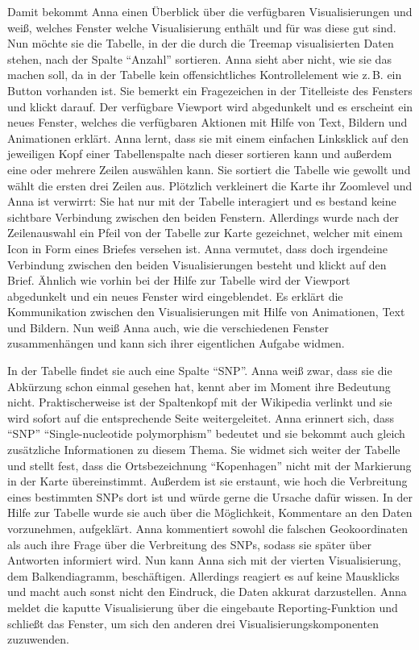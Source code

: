\documentclass[
	headsepline,
	footsepline,
	fontsize=12pt,
	bibliography=totoc
]{scrbook}
\begin{document}
Damit bekommt Anna einen Überblick über die verfügbaren Visualisierungen und weiß, welches Fenster welche Visualisierung enthält und für was diese gut sind. Nun möchte sie die Tabelle, in der die durch die Treemap visualisierten Daten stehen, nach der Spalte \enquote{Anzahl} sortieren. Anna sieht aber nicht, wie sie das machen soll, da in der Tabelle kein offensichtliches Kontrollelement wie z.\,B. ein Button vorhanden ist. Sie bemerkt ein Fragezeichen in der Titelleiste des Fensters und klickt darauf. Der verfügbare Viewport wird abgedunkelt und es erscheint ein neues Fenster, welches die verfügbaren Aktionen mit Hilfe von Text, Bildern und Animationen erklärt. Anna lernt, dass sie mit einem einfachen Linksklick auf den jeweiligen Kopf einer Tabellenspalte nach dieser sortieren kann und außerdem eine oder mehrere Zeilen auswählen kann. Sie sortiert die Tabelle wie gewollt und wählt die ersten drei Zeilen aus. Plötzlich verkleinert die Karte ihr Zoomlevel und Anna ist verwirrt: Sie hat nur mit der Tabelle interagiert und es bestand keine sichtbare Verbindung zwischen den beiden Fenstern. Allerdings wurde nach der Zeilenauswahl ein Pfeil von der Tabelle zur Karte gezeichnet, welcher mit einem Icon in Form eines Briefes versehen ist. Anna vermutet, dass doch irgendeine Verbindung zwischen den beiden Visualisierungen besteht und klickt auf den Brief. Ähnlich wie vorhin bei der Hilfe zur Tabelle wird der Viewport abgedunkelt und ein neues Fenster wird eingeblendet. Es erklärt die Kommunikation zwischen den Visualisierungen mit Hilfe von Animationen, Text und Bildern. Nun weiß Anna auch, wie die verschiedenen Fenster zusammenhängen und kann sich ihrer eigentlichen Aufgabe widmen.


In der Tabelle findet sie auch eine Spalte \enquote{SNP}. Anna weiß zwar, dass sie die Abkürzung schon einmal gesehen hat, kennt aber im Moment ihre Bedeutung nicht. Praktischerweise ist der Spaltenkopf mit der Wikipedia verlinkt und sie wird sofort auf die entsprechende Seite weitergeleitet. Anna erinnert sich, dass \enquote{SNP} \enquote{Single-nucleotide polymorphism} bedeutet und sie bekommt auch gleich zusätzliche Informationen zu diesem Thema. Sie widmet sich weiter der Tabelle und stellt fest, dass die Ortsbezeichnung \enquote{Kopenhagen} nicht mit der Markierung in der Karte übereinstimmt. Außerdem ist sie erstaunt, wie hoch die Verbreitung eines bestimmten SNPs dort ist und würde gerne die Ursache dafür wissen. In der Hilfe zur Tabelle wurde sie auch über die Möglichkeit, Kommentare an den Daten vorzunehmen, aufgeklärt. Anna kommentiert sowohl die falschen Geokoordinaten als auch ihre Frage über die Verbreitung des SNPs, sodass sie später über Antworten informiert wird. Nun kann Anna sich mit der vierten Visualisierung, dem Balkendiagramm, beschäftigen. Allerdings reagiert es auf keine Mausklicks und macht auch sonst nicht den Eindruck, die Daten akkurat darzustellen. Anna meldet die kaputte Visualisierung über die eingebaute Reporting-Funktion und schließt das Fenster, um sich den anderen drei Visualisierungskomponenten zuzuwenden.
\end{document}
